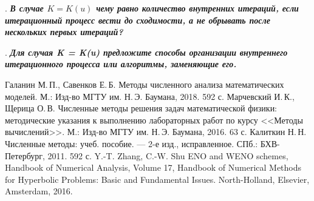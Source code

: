 \documentclass[12pt, a4paper]{article}
\newcounter{mycounter}
\newcommand{\quastion}[1]{%
	\stepcounter{mycounter}%
	\textbf{\themycounter}.  %
	\textbf{\textit{#1}}
	
}
\begin{document}
	
	\clearpage %
	\quastion{В случае $K = K(u)$ чему равно количество внутренних итераций, если итерационный процесс вести до сходимости, а не обрывать после нескольких первых итераций?}
	
	\clearpage %
	\quastion{Для случая K = K(u) предложите способы организации внутреннего итерационного процесса или алгоритмы, заменяющие его.}
	
	
	
	
	
	\clearpage
	\begin{thebibliography}{1}
		 Галанин М.\,П., Савенков Е.\,Б. Методы численного анализа математических моделей. М.: Изд-во МГТУ им. Н.\,Э. Баумана, 2018. 592 с.
		 Марчевский И.\,К., Щерица О.\,В. Численные методы решения задач математической физики: методические указания к выполнению лабораторных работ по курсу <<Методы вычислений>>. М.: Изд-во МГТУ им. Н.\,Э. Баумана, 2016. 63 с.
		 Калиткин Н.\,Н.
		Численные методы: учеб. пособие. —
		2-е изд., исправленное. СПб.: БХВ-Петербург, 2011. 
		592 с. 
		  Y.-T. Zhang, C.-W. Shu ENO and WENO schemes, Handbook of Numerical Analysis, Volume 17, Handbook of Numerical Methods for Hyperbolic Problems: Basic and Fundamental Issues. North-Holland, Elsevier, Amsterdam, 2016.
	\end{thebibliography}
	
\end{document}
